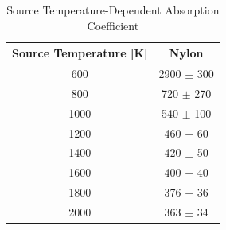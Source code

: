 \documentclass[12pt,oneside]{book}
\begin{document}
\begin{table}[!ht]{}
\centering
\caption[Source Temperature-Dependent Absorption Coefficient]{Source Temperature-Dependent Absorption Coefficient}
{\begin{tabular}{cc}
\toprule
Source Temperature [K]			& Nylon	\\
\midrule
600						& 2900 $\pm$ 300\\ 
800						& 720 $\pm$ 270	\\
1000					& 540 $\pm$ 100	\\
1200					& 460 $\pm$ 60	\\ 
1400					& 420 $\pm$ 50 \\
1600					& 400 $\pm$ 40	\\
1800					& 376 $\pm$ 36	\\ 
2000					& 363 $\pm$ 34	\\
\bottomrule
\end{tabular}}
\label{tab:nylon_absorption_coefficient}
\end{table}


\end{document}

